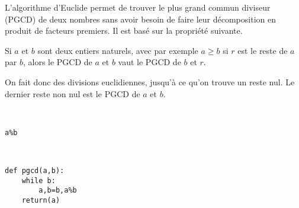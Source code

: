 \ifprof 
\else
L'algorithme d'Euclide permet de trouver le plus grand commun diviseur (PGCD)  de deux nombres sans avoir besoin de faire leur décomposition en produit de facteurs premiers. Il est basé sur la propriété suivante.

\begin{prop}
Si $a$ et $b$ sont deux entiers naturels, avec par exemple $a\geq b$ si $r$ est le reste de $a$ par $b$, alors le PGCD de $a$ et $b$ vaut le PGCD de $b$ et $r$. 

\end{prop}

On fait donc des divisions euclidiennes, jusqu'à ce qu'on trouve un reste nul. Le dernier reste non nul est le PGCD de $a$ et $b$.
\fi

\ifprof
\begin{corrige}~\\ \vspace{-.5cm}
\begin{lstlisting}
a%b
\end{lstlisting}
\end{corrige}
\else
\fi

\ifprof
\begin{corrige}~\\ \vspace{-.5cm}
\begin{lstlisting}
def pgcd(a,b):
    while b:
        a,b=b,a%b
    return(a)
\end{lstlisting}
\end{corrige}
\else
\fi